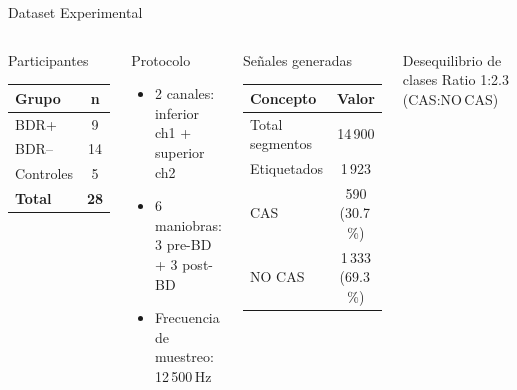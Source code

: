 ﻿\documentclass[aspectratio=169,10pt]{beamer}
\begin{document}
\begin{frame}{Dataset Experimental}
  \begin{columns}
      \begin{block}{Participantes}
        \centering\small
        \begin{tabular}{lc}
          \toprule
          \textbf{Grupo} & \textbf{n} \\
          \midrule
          BDR+ & 9 \\
          BDR-- & 14 \\
          Controles & 5 \\
          \midrule
          \textbf{Total} & \textbf{28} \\
          \bottomrule
        \end{tabular}
      \end{block}
      \begin{block}{Protocolo}
        \begin{itemize}\small
          \item 2 canales: inferior ch1 + superior ch2
          \item 6 maniobras: 3 pre-BD + 3 post-BD
          \item Frecuencia de muestreo: 12\,500\,Hz
        \end{itemize}
      \end{block}
      \begin{block}{Señales generadas}
        \centering\small
        \begin{tabular}{lc}
          \toprule
          \textbf{Concepto} & \textbf{Valor} \\
          \midrule
          Total segmentos & 14\,900 \\
          Etiquetados & 1\,923 \\
          \quad CAS & 590 (30.7\,\%) \\
          \quad NO CAS & 1\,333 (69.3\,\%) \\
          \bottomrule
        \end{tabular}
      \end{block}
      \begin{alertblock}{Desequilibrio de clases}
        \centering\small
        Ratio 1:2.3 (CAS:NO\,CAS)
      \end{alertblock}
  \end{columns}
\end{frame}
\end{document}
